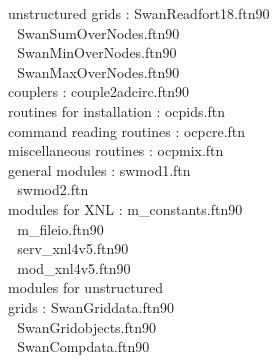 \documentclass[12pt]{book}
\begin{document}
\begin{tabbing}
unstructured grids        \>:       SwanReadfort18.ftn90 \\
                          \> $\,\,$ SwanSumOverNodes.ftn90 \\
                          \> $\,\,$ SwanMinOverNodes.ftn90 \\
                          \> $\,\,$ SwanMaxOverNodes.ftn90 \\
couplers                  \>:       couple2adcirc.ftn90 \\
routines for installation \>:       ocpids.ftn \\
command reading routines  \>:       ocpcre.ftn \\
miscellaneous routines    \>:       ocpmix.ftn \\
general modules           \>:       swmod1.ftn \\
                          \> $\,\,$ swmod2.ftn \\
modules for XNL           \>:       m\_constants.ftn90 \\
                          \> $\,\,$ m\_fileio.ftn90 \\
                          \> $\,\,$ serv\_xnl4v5.ftn90 \\
                          \> $\,\,$ mod\_xnl4v5.ftn90 \\
modules for unstructured  \> $\,\,$ \\
grids                     \>:       SwanGriddata.ftn90 \\
                          \> $\,\,$ SwanGridobjects.ftn90 \\
                          \> $\,\,$ SwanCompdata.ftn90 \\
\end{tabbing}
\end{document}
